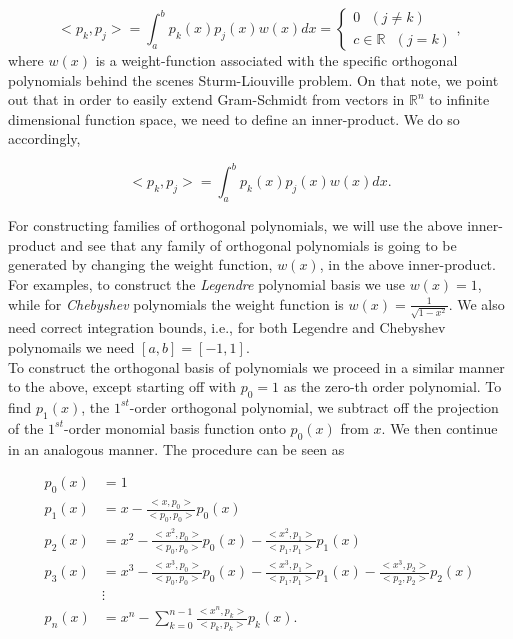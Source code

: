 $$<p_k, p_j> = \int_{a}^{b} p_k(x) p_j(x) w(x) dx = \left\{ \begin{array}{c} 0 \ \ \ (j\neq k) \\ c\in\mathbb{R} \ \ \ (j=k)  \end{array} \right. ,$$
%
where $w(x)$ is a weight-function associated with the specific orthogonal polynomials behind the scenes Sturm-Liouville problem. On that note, we point out that in order to easily extend Gram-Schmidt from vectors in $\mathbb{R}^n$ to infinite dimensional function space, we need to define an inner-product. We do so accordingly,

$$<p_k, p_j> = \int_{a}^{b} p_k(x) p_j(x) w(x) dx.$$

For constructing families of orthogonal polynomials, we will use the above inner-product and see that any family of orthogonal polynomials is going to be generated by changing the weight function, $w(x)$, in the above inner-product. For examples, to construct the \emph{Legendre} polynomial basis we use $w(x)=1$, while for \emph{Chebyshev} polynomials the weight function is $w(x) = \frac{1}{\sqrt{1-x^2}}.$ We also need correct integration bounds, i.e., for both Legendre and Chebyshev polynomails we need $[a,b]=[-1,1].$\\

To construct the orthogonal basis of polynomials we proceed in a similar manner to the above, except starting off with $p_0=1$ as the zero-th order polynomial. To find $p_1(x)$, the $1^{st}$-order orthogonal polynomial, we subtract off the projection of the $1^{st}$-order monomial basis function onto $p_0(x)$ from $x$. We then continue in an analogous manner. The procedure can be seen as 

\begin{align*}
p_0(x) &= 1 \\
p_1(x) &= x - \frac{ < x, p_0>  }{ <p_0, p_0>  } p_0(x) \\
p_2(x) &= x^2 - \frac{ < x^2 , p_0>  }{ <p_0, p_0>  } p_0(x) -  \frac{ < x^2 , p_1>  }{ <p_1, p_1>  } p_1(x) \\
p_3(x) &= x^3 - \frac{ < x^3 , p_0>  }{ <p_0, p_0>  } p_0(x) -  \frac{ < x^3 , p_1>  }{ <p_1, p_1>  } p_1(x) -  \frac{ < x^3 , p_2>  }{ <p_2, p_2>  } p_2(x)  \\
&\vdots \\
p_n(x) &= x^n  - \sum_{k=0}^{n-1} \frac{ < x^n , p_k>  }{ <p_k, p_k>  } p_k(x). \\
\end{align*}

